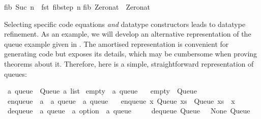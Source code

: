 \begin{isabellebody}
\begin{isamarkuptext}
fib\ {\isacharparenleft}Suc\ n{\isacharparenright}\ {\isacharequal}\ fst\ {\isacharparenleft}fib{\isacharunderscore}step\ n{\isacharparenright}{\isacharsemicolon}\isanewline
fib\ Zero{\isacharunderscore}nat\ {\isacharequal}\ Zero{\isacharunderscore}nat{\isacharsemicolon}\isanewline%
\end{isamarkuptext}%
\isamarkuptrue%
%
\endisatagquotetypewriter
{\isafoldquotetypewriter}%
%
\isadelimquotetypewriter
%
\endisadelimquotetypewriter
%
\isamarkuptrue%
%
\begin{isamarkuptext}%
Selecting specific code equations \emph{and} datatype constructors
  leads to datatype refinement.  As an example, we will develop an
  alternative representation of the queue example given in
  .  The amortised representation is
  convenient for generating code but exposes its 
  details, which may be cumbersome when proving theorems about it.
  Therefore, here is a simple, straightforward representation of
  queues:%
\end{isamarkuptext}%
\isamarkuptrue%
%
\isadelimquote
%
\endisadelimquote
%
\isatagquote
{}\isamarkupfalse%
\ {\isacharprime}a\ queue\ {\isacharequal}\ Queue\ {\isachardoublequoteopen}{\isacharprime}a\ list{\isachardoublequoteclose}\isanewline
\isanewline
{}\isamarkupfalse%
\ empty\ {\isacharcolon}{\isacharcolon}\ {\isachardoublequoteopen}{\isacharprime}a\ queue{\isachardoublequoteclose}\ \isanewline
\ \ {\isachardoublequoteopen}empty\ {\isacharequal}\ Queue\ {\isacharbrackleft}{\isacharbrackright}{\isachardoublequoteclose}\isanewline
\isanewline
{}\isamarkupfalse%
\ enqueue\ {\isacharcolon}{\isacharcolon}\ {\isachardoublequoteopen}{\isacharprime}a\ {\isasymRightarrow}\ {\isacharprime}a\ queue\ {\isasymRightarrow}\ {\isacharprime}a\ queue{\isachardoublequoteclose}\ \isanewline
\ \ {\isachardoublequoteopen}enqueue\ x\ {\isacharparenleft}Queue\ xs{\isacharparenright}\ {\isacharequal}\ Queue\ {\isacharparenleft}xs\ {\isacharat}\ {\isacharbrackleft}x{\isacharbrackright}{\isacharparenright}{\isachardoublequoteclose}\isanewline
\isanewline
{}\isamarkupfalse%
\ dequeue\ {\isacharcolon}{\isacharcolon}\ {\isachardoublequoteopen}{\isacharprime}a\ queue\ {\isasymRightarrow}\ {\isacharprime}a\ option\ {\isasymtimes}\ {\isacharprime}a\ queue{\isachardoublequoteclose}\ \isanewline
\ \ \ \ {\isachardoublequoteopen}dequeue\ {\isacharparenleft}Queue\ {\isacharbrackleft}{\isacharbrackright}{\isacharparenright}\ {\isacharequal}\ {\isacharparenleft}None{\isacharcomma}\ Queue\ {\isacharbrackleft}{\isacharbrackright}{\isacharparenright}{\isachardoublequoteclose}\isanewline

\end{isabellebody}
